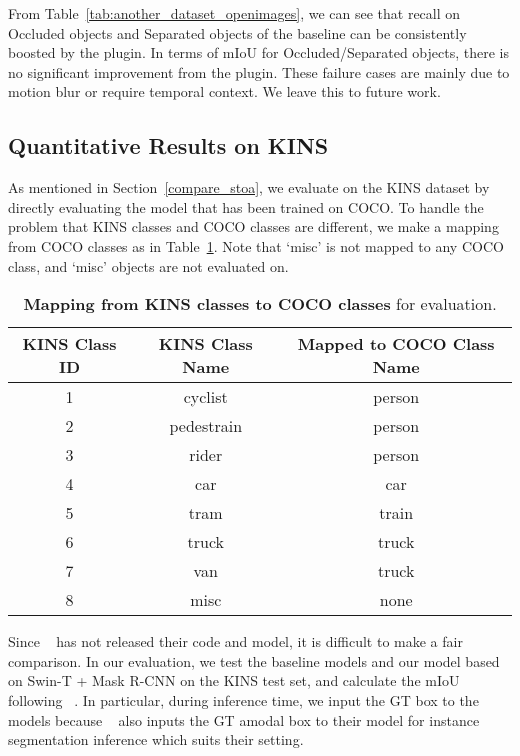 \documentclass{bmvc2k}
\begin{document}
From Table~\ref{tab:another_dataset_openimages}, 
we can see that recall on Occluded objects and Separated objects of the baseline can be consistently boosted by the plugin. In terms of mIoU for Occluded/Separated objects, there is no significant improvement from the plugin.  These failure cases are mainly due to motion blur or require temporal context. We leave this to future work. 




\subsection{Quantitative Results on KINS}
\label{sec:sup_kins}


As mentioned in Section~\ref{compare_stoa}, we evaluate on the KINS dataset
by directly evaluating the model that has been trained on COCO.
To handle the problem that KINS classes and COCO classes are different, we make a mapping from COCO classes as in Table~\ref{table:another_dataset_kins_class_mapping}. 
Note that ‘misc’ is not mapped to any COCO class, 
and ‘misc’ objects are not evaluated on.

\begin{table}[!htb]

\centering
\begin{tabular}{ccc}
\toprule
  KINS Class ID & KINS Class Name & Mapped to COCO Class Name  \\ \midrule
  1 & cyclist & person \\ 
  2 & pedestrain & person \\ 
  3 & rider & person \\ 
  4 & car & car \\ 
  5 & tram & train \\ 
  6 & truck & truck \\ 
  7 & van & truck \\ 
  8 & misc & none \\ \bottomrule
\end{tabular}
\vspace{.4cm}
\caption{\color{bmvc_blue} \textbf{Mapping from KINS classes to COCO classes} for evaluation.}
\label{table:another_dataset_kins_class_mapping}
\end{table}

Since ~\cite{yuan2021robust} has not released their code and model, 
it is difficult to make a fair comparison. 
In our evaluation, we test the baseline models and our model based on Swin-T + Mask R-CNN on the KINS test set, 
and calculate the mIoU following ~\cite{yuan2021robust}. 
In particular, during inference time, we input the GT box to the models because ~\cite{yuan2021robust} also inputs the GT amodal box to their model for instance segmentation inference which suits their setting. 
\end{document}

